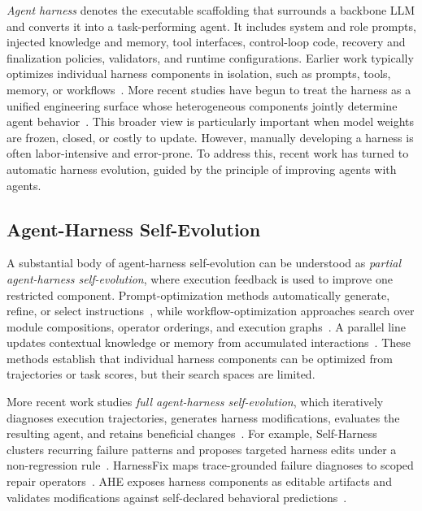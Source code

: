 \emph{Agent harness} denotes the executable scaffolding that surrounds a backbone LLM and converts it into a task-performing agent. It includes system and role prompts, injected knowledge and memory, tool interfaces, control-loop code, recovery and finalization policies, validators, and runtime configurations. Earlier work typically optimizes individual harness components in isolation, such as prompts, tools, memory, or workflows~\cite{hu-etal-2026-evermemos,su-etal-2026-u}. More recent studies have begun to treat the harness as a unified engineering surface whose heterogeneous components jointly determine agent behavior~\citep{gao2026survey,xu2026lifeharness}. This broader view is particularly important when model weights are frozen, closed, or costly to update.
%
However, manually developing a harness is often labor-intensive and error-prone. To address this, recent work has turned to automatic harness evolution, guided by the principle of improving agents with agents.

\subsection{Agent-Harness Self-Evolution}
A substantial body of agent-harness self-evolution can be understood as \emph{partial agent-harness self-evolution}, where execution feedback is used to improve one restricted component. Prompt-optimization methods automatically generate, refine, or select instructions~\citep{zhou2023ape,yang2024opro,khattab2024dspy,agrawal2026gepa}, while workflow-optimization approaches search over module compositions, operator orderings, and execution graphs~\citep{zhang2025aflow,lu2026empiricalmcts}. A parallel line updates contextual knowledge or memory from accumulated interactions~\citep{zhang2025ace,liu2026evolvemem,yu2026molem,zhang2026latentevolve}. 
These methods establish that individual harness components can be optimized from trajectories or task scores, but their search spaces are limited.

More recent work studies \emph{full agent-harness self-evolution}, which iteratively diagnoses execution trajectories, generates harness modifications, evaluates the resulting agent, and retains beneficial changes~\citep{lee2026metaharness,chen2026harnessx}. For example, Self-Harness clusters recurring failure patterns and proposes targeted harness edits under a non-regression rule~\citep{zhang2026selfharness}. HarnessFix maps trace-grounded failure diagnoses to scoped repair operators~\citep{chen2026harnessfix}. AHE exposes harness components as editable artifacts and validates modifications against self-declared behavioral predictions~\citep{lin2026ahe}. %

